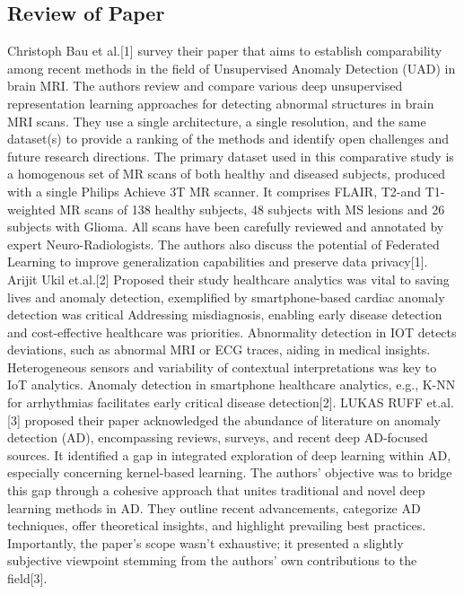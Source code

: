 \subsection{Review of Paper}
Christoph Bau et al.[1] survey their paper that aims to establish comparability among recent methods in the field of Unsupervised Anomaly Detection (UAD) in brain MRI. The authors review and compare various deep unsupervised representation learning approaches for detecting abnormal structures in brain MRI scans. They use a single architecture, a single resolution, and the same dataset(s) to provide a ranking of the methods and identify open challenges and future research directions. The primary dataset used in this comparative study is a homogenous set of MR scans of both healthy and diseased subjects, produced with a single Philips Achieve 3T MR scanner. It comprises FLAIR, T2-and T1-weighted MR scans of 138 healthy subjects, 48 subjects with MS lesions and 26 subjects with Glioma. All scans have been carefully reviewed and annotated by expert Neuro-Radiologists. The authors also discuss the potential of Federated Learning to improve generalization capabilities and preserve data privacy[1]. Arijit Ukil et.al.[2] Proposed their study healthcare analytics was vital to saving lives and anomaly detection, exemplified by smartphone-based cardiac anomaly detection was critical Addressing misdiagnosis, enabling early disease detection and cost-effective healthcare was priorities. Abnormality detection in IOT detects deviations, such as abnormal MRI or ECG traces, aiding in medical insights. Heterogeneous sensors and variability of contextual interpretations was key to IoT analytics. Anomaly detection in smartphone healthcare analytics, e.g., K-NN for arrhythmias facilitates early critical disease detection[2]. LUKAS RUFF et.al.[3] proposed their paper acknowledged the abundance of literature on anomaly detection (AD), encompassing reviews, surveys, and recent deep AD-focused sources. It identified a gap in integrated exploration of deep learning within AD, especially concerning kernel-based learning. The authors' objective was to bridge this gap through a cohesive approach that unites traditional and novel deep learning methods in AD. They outline recent advancements, categorize AD techniques, offer theoretical insights, and highlight prevailing best practices. Importantly, the paper's scope wasn't exhaustive; it presented a slightly subjective viewpoint stemming from the authors' own contributions to the field[3]. \vspace{5mm} \newline
